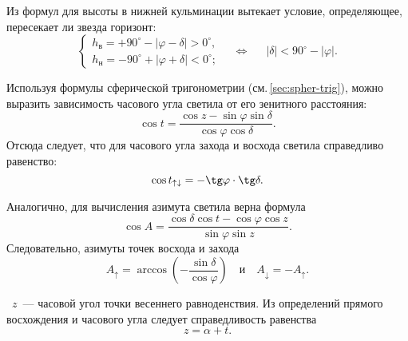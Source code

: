 Из формул для высоты в нижней кульминации вытекает условие, определяющее, пересекает ли звезда горизонт:
\begin{equation}
    \begin{cases}
        h_\text{в} = +90^\circ - |\varphi - \delta| > 0^\circ,\\
        h_\text{н} = - 90^\circ + |\varphi + \delta| < 0^\circ;
    \end{cases}
    \quad \Longleftrightarrow \quad~~ |\delta|< 90^{\circ} - |\varphi|.
\end{equation}

Используя формулы сферической тригонометрии (см.\,\ref{sec:spher-trig}), можно выразить зависимость часового угла светила от его зенитного расстояния:
\begin{equation}
    \cos t=\frac{\cos z-\sin\varphi\sin\delta}{\cos\varphi\cos\delta}.
\end{equation}
Отсюда следует, что для часового угла захода и восхода светила справедливо равенство:
\begin{equation}
    \cos t_{\uparrow\downarrow}=-\tg\varphi\cdot\tg\delta.
\end{equation}

Аналогично, для вычисления азимута светила верна формула
\begin{equation}
    \cos A=\frac{\cos\delta\cos t-\cos\varphi\cos z}{\sin\varphi\sin z}.
\end{equation}
Следовательно, азимуты точек восхода и захода
\begin{equation}
    A_\uparrow = \arccos \left(-\dfrac{\sin\delta}{\cos \varphi} \right)\quad\text{и}\quad A_\downarrow = - A_\uparrow.
\end{equation}

~$z$~--- часовой угол точки весеннего равноденствия. Из определений прямого восхождения и часового угла следует справедливость равенства\begin{equation}
z = \alpha + t.
\end{equation}
